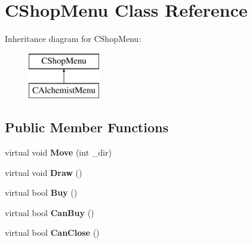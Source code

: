 \hypertarget{class_c_shop_menu}{}\section{C\+Shop\+Menu Class Reference}
\label{class_c_shop_menu}
Inheritance diagram for C\+Shop\+Menu\+:\begin{figure}[H]
\begin{center}
\leavevmode
\includegraphics[height=2.000000cm]{class_c_shop_menu}
\end{center}
\end{figure}
\subsection*{Public Member Functions}
\begin{DoxyCompactItemize}
\item 
virtual void {\bfseries Move} (int \+\_\+dir)\hypertarget{class_c_shop_menu_ab30b209f6fee6e4b7c5ae71f6c8a3ab9}{}\label{class_c_shop_menu_ab30b209f6fee6e4b7c5ae71f6c8a3ab9}

\item 
virtual void {\bfseries Draw} ()\hypertarget{class_c_shop_menu_ac0ff02e1cf8a9bc30851a97f6d1d758a}{}\label{class_c_shop_menu_ac0ff02e1cf8a9bc30851a97f6d1d758a}

\item 
virtual bool {\bfseries Buy} ()\hypertarget{class_c_shop_menu_a848ae2ce17e81dc8a4c7b44cb5883a45}{}\label{class_c_shop_menu_a848ae2ce17e81dc8a4c7b44cb5883a45}

\item 
virtual bool {\bfseries Can\+Buy} ()\hypertarget{class_c_shop_menu_adf8f8f2be599d4149a302d516e12105c}{}\label{class_c_shop_menu_adf8f8f2be599d4149a302d516e12105c}

\item 
virtual bool {\bfseries Can\+Close} ()\hypertarget{class_c_shop_menu_adb6bd28f67d5ceede013f21e1bddee06}{}\label{class_c_shop_menu_adb6bd28f67d5ceede013f21e1bddee06}

\end{DoxyCompactItemize}

